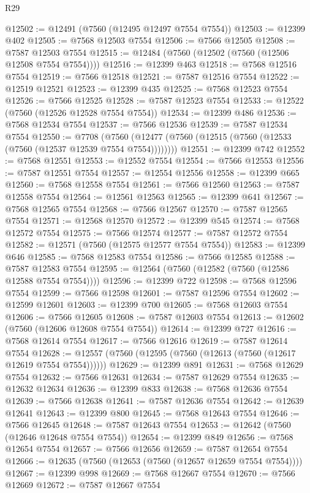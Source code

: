 \begin{lexlean}{R29}
\begin{coremodule}
@12502 := @12491 (@7560 (@12495 @12497 @7554 @7554))
@12503 := @12399 @402
@12505 := @7568 @12503 @7554
@12506 := @7566 @12505
@12508 := @7587 @12503 @7554
@12515 := @12484 (@7560 (@12502 (@7560 (@12506 @12508 @7554 @7554))))
@12516 := @12399 @463
@12518 := @7568 @12516 @7554
@12519 := @7566 @12518
@12521 := @7587 @12516 @7554
@12522 := @12519 @12521
@12523 := @12399 @435
@12525 := @7568 @12523 @7554
@12526 := @7566 @12525
@12528 := @7587 @12523 @7554
@12533 := @12522 (@7560 (@12526 @12528 @7554 @7554))
@12534 := @12399 @486
@12536 := @7568 @12534 @7554
@12537 := @7566 @12536
@12539 := @7587 @12534 @7554
@12550 := @7708
    (@7560 (@12477 (@7560 (@12515 (@7560 (@12533 (@7560 (@12537 @12539 @7554 @7554))))))))
@12551 := @12399 @742
@12552 := @7568 @12551
@12553 := @12552 @7554
@12554 := @7566 @12553
@12556 := @7587 @12551 @7554
@12557 := @12554 @12556
@12558 := @12399 @665
@12560 := @7568 @12558 @7554
@12561 := @7566 @12560
@12563 := @7587 @12558 @7554
@12564 := @12561 @12563
@12565 := @12399 @641
@12567 := @7568 @12565 @7554
@12568 := @7566 @12567
@12570 := @7587 @12565 @7554
@12571 := @12568 @12570
@12572 := @12399 @545
@12574 := @7568 @12572 @7554
@12575 := @7566 @12574
@12577 := @7587 @12572 @7554
@12582 := @12571 (@7560 (@12575 @12577 @7554 @7554))
@12583 := @12399 @646
@12585 := @7568 @12583 @7554
@12586 := @7566 @12585
@12588 := @7587 @12583 @7554
@12595 := @12564 (@7560 (@12582 (@7560 (@12586 @12588 @7554 @7554))))
@12596 := @12399 @722
@12598 := @7568 @12596 @7554
@12599 := @7566 @12598
@12601 := @7587 @12596 @7554
@12602 := @12599 @12601
@12603 := @12399 @700
@12605 := @7568 @12603 @7554
@12606 := @7566 @12605
@12608 := @7587 @12603 @7554
@12613 := @12602 (@7560 (@12606 @12608 @7554 @7554))
@12614 := @12399 @727
@12616 := @7568 @12614 @7554
@12617 := @7566 @12616
@12619 := @7587 @12614 @7554
@12628 := @12557 (@7560 (@12595 (@7560 (@12613 (@7560 (@12617 @12619 @7554 @7554))))))
@12629 := @12399 @891
@12631 := @7568 @12629 @7554
@12632 := @7566 @12631
@12634 := @7587 @12629 @7554
@12635 := @12632 @12634
@12636 := @12399 @833
@12638 := @7568 @12636 @7554
@12639 := @7566 @12638
@12641 := @7587 @12636 @7554
@12642 := @12639 @12641
@12643 := @12399 @800
@12645 := @7568 @12643 @7554
@12646 := @7566 @12645
@12648 := @7587 @12643 @7554
@12653 := @12642 (@7560 (@12646 @12648 @7554 @7554))
@12654 := @12399 @849
@12656 := @7568 @12654 @7554
@12657 := @7566 @12656
@12659 := @7587 @12654 @7554
@12666 := @12635 (@7560 (@12653 (@7560 (@12657 @12659 @7554 @7554))))
@12667 := @12399 @998
@12669 := @7568 @12667 @7554
@12670 := @7566 @12669
@12672 := @7587 @12667 @7554

\end{coremodule}
\end{lexlean}
